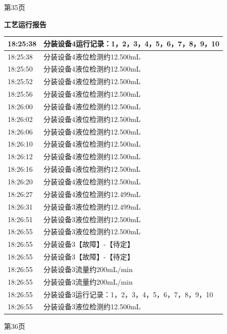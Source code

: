 \documentclass[UTF8,10pt,a4paper,fontset=fandol]{ctexart}
\begin{document}
\begin{center}
\begin{minipage}[t]{0.46\linewidth}
\vspace{0.2cm}
第35页
\end{minipage}
\hfill
\begin{minipage}[t]{0.46\linewidth}
\centering
\textbf{工艺运行报告}

\smallskip
\begin{tabular}{|p{1.05cm}|p{5.65cm}|}
\hline
18:25:38 & 分装设备4运行记录：1，2，3，4，5，6，7，8，9，10 \\ \hline
18:25:38 & 分装设备4液位检测约12.500mL \\ \hline
18:25:50 & 分装设备4液位检测约12.500mL \\ \hline
18:25:52 & 分装设备4液位检测约12.500mL \\ \hline
18:25:56 & 分装设备4液位检测约12.500mL \\ \hline
18:26:00 & 分装设备4液位检测约12.500mL \\ \hline
18:26:02 & 分装设备4液位检测约12.500mL \\ \hline
18:26:06 & 分装设备4液位检测约12.500mL \\ \hline
18:26:10 & 分装设备4液位检测约12.500mL \\ \hline
18:26:12 & 分装设备4液位检测约12.500mL \\ \hline
18:26:16 & 分装设备4液位检测约12.500mL \\ \hline
18:26:20 & 分装设备4液位检测约12.500mL \\ \hline
18:26:27 & 分装设备4液位检测约12.499mL \\ \hline
18:26:31 & 分装设备3液位检测约12.499mL \\ \hline
18:26:51 & 分装设备3液位检测约12.500mL \\ \hline
18:26:55 & 分装设备3液位检测约12.500mL \\ \hline
18:26:55 & 分装设备3【故障】-【待定】 \\ \hline
18:26:55 & 分装设备3【故障】-【待定】 \\ \hline
18:26:55 & 分装设备3流量约200mL/min \\ \hline
18:26:55 & 分装设备3流量约200mL/min \\ \hline
18:26:55 & 分装设备3运行记录：1，2，3，4，5，6，7，8，9，10 \\ \hline
18:26:55 & 分装设备3液位检测约12.500mL \\ \hline
\end{tabular}

\vspace{0.2cm}
第36页
\end{minipage}


\end{center}
\end{document}
